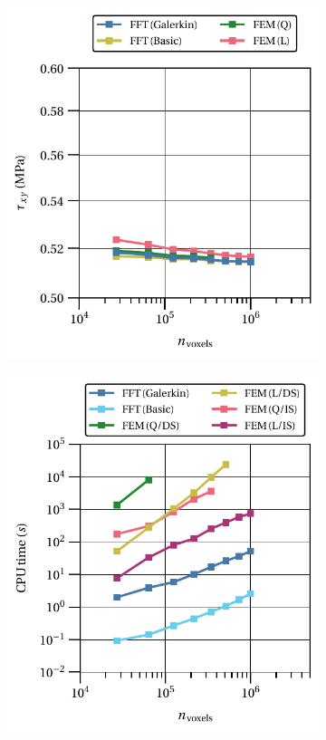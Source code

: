 \begin{figure}[hbt]
\centering
	\begin{subfigure}[b]{0.49\textwidth}
    \centering
    \includegraphics[width=\textwidth]{figures/linear_3D_shear_homo_stress_12_vs_n_voxels}
    \caption{}
    \label{subfig:linear_3D_shear_homo_stress_12_vs_n_voxels}
  \end{subfigure}
  \begin{subfigure}[b]{0.49\textwidth}
    \centering
    \includegraphics[width=\textwidth]{figures/linear_3D_shear_cpu_time_vs_n_voxels}

\end{subfigure}
\end{figure}
